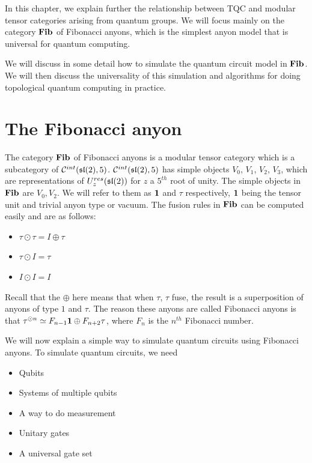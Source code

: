 In this chapter, we explain further the relationship between TQC and modular tensor
categories arising from quantum groups. We will focus mainly on the category
$\mathbf{Fib}$ of Fibonacci anyons, which is the simplest anyon model that is universal for
quantum computing. 

We will discuss in some detail how to simulate the quantum
circuit model in $\mathbf{Fib}$. We will then discuss the universality of this
simulation and algorithms for doing topological quantum computing in practice.

\section{The Fibonacci anyon}
The category $\mathbf{Fib}$ of Fibonacci anyons is a modular tensor category which is a
subcategory of $\mathcal{C}^{int}(\mathfrak{sl}(2),5)$. $\mathcal{C}^{int}(\mathfrak{sl}(2),5)$
has simple objects $V_0$, $V_1$, $V_2$, $V_3$, which are representations of
$U_z^{res}(\mathfrak{sl}(2))$ for $z$ a $5^{th}$ root of unity. The simple objects in 
$\mathbf{Fib}$ are $V_0, V_2$. We will refer to them as $\mathbf{1}$ and $\tau$
respectively, $\mathbf{1}$ being the tensor unit and trivial anyon type or vacuum. The
fusion rules in $\mathbf{Fib}$ can be computed easily and are as follows:

\begin{itemize}
    \item $\tau \odot \tau = I \oplus \tau$
    \item $\tau \odot I = \tau$
    \item $I \odot I = I$
\end{itemize}

Recall that the $\oplus$ here means that when $\tau$, $\tau$ fuse, the result
is a superposition of anyons of type $1$ and $\tau$.  The reason these anyons are
called Fibonacci anyons is that $\tau^{\odot n} \simeq F_{n-1} \mathbf{1} \oplus F_{n+2}
\tau$, where $F_n$ is the $n^{th}$ Fibonacci number.

We will now explain a simple way to simulate quantum circuits using Fibonacci
anyons. To simulate quantum circuits, we need

\begin{itemize}
\item Qubits
\item Systems of multiple qubits
\item A way to do measurement
\item Unitary gates
\item A universal gate set
\end{itemize}

